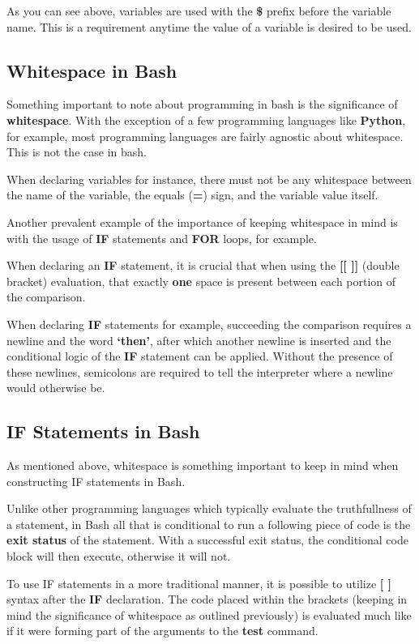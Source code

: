 \documentclass{article}
\begin{document}
As you can see above, variables are used with the \textbf{\$} prefix before the variable name. This is a requirement anytime the
value of a variable is desired to be used.

\subsection{Whitespace in Bash}

Something important to note about programming in bash is the significance of \textbf{whitespace}. With the exception of a few programming languages
like \textbf{Python}, for example, most programming languages are fairly agnostic about whitespace. This is not the case in bash.

When declaring variables for instance, there must not be any whitespace between the name of the variable, the equals (\textbf{=}) sign, and the variable
value itself.

Another prevalent example of the importance of keeping whitespace in mind is with the usage of \textbf{IF} statements and \textbf{FOR} loops, for example.

When declaring an \textbf{IF} statement, it is crucial that when using the \textbf{[[ ]]} (double bracket) evaluation, that exactly \textbf{one} space is
present between each portion of the comparison.

When declaring \textbf{IF} statements for example, succeeding the comparison requires a newline and the word \textbf{`then'}, after which
another newline is inserted and the conditional logic of the \textbf{IF} statement can be applied. Without the presence of these newlines, semicolons are required
to tell the interpreter where a newline would otherwise be.

\subsection{IF Statements in Bash}

As mentioned above, whitespace is something important to keep in mind when constructing IF statements in Bash.

Unlike other programming languages which typically evaluate the truthfullness of a statement, in Bash all that is conditional to run a following piece of code is the
\textbf{exit status} of the statement. With a successful exit status, the conditional code block will then execute, otherwise it will not.

To use IF statements in a more traditional manner, it is possible to utilize \textbf{[ ]} syntax after the \textbf{IF} declaration. The
code placed within the brackets (keeping in mind the significance of whitespace as outlined previously) is evaluated much like if it were
forming part of the arguments to the \textbf{test} command.
\end{document}
